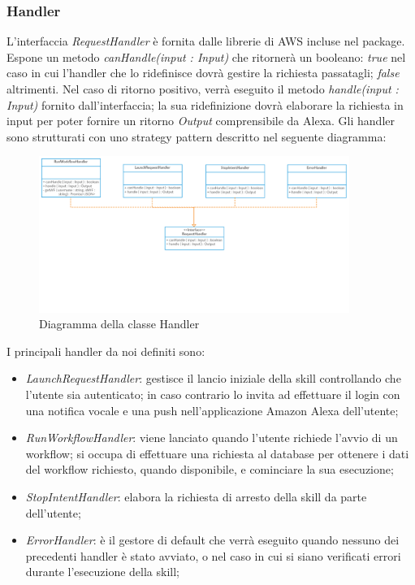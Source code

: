 \subsubsection{Handler}
L'interfaccia \emph{RequestHandler} è fornita dalle librerie di AWS incluse nel package.
Espone un metodo \textit{canHandle(input : Input)} che ritornerà un booleano: \textit{true} nel caso in cui l'handler che lo ridefinisce dovrà gestire la richiesta passatagli; \textit{false} altrimenti.
Nel caso di ritorno positivo, verrà eseguito il metodo \textit{handle(input : Input)} fornito dall'interfaccia; la sua ridefinizione dovrà elaborare la richiesta in input per poter fornire un ritorno \textit{Output} comprensibile da Alexa.
Gli handler sono strutturati con uno strategy pattern descritto nel seguente diagramma:

\begin{figure}[H]
	\begin{center}
		\includegraphics[width=0.9\textwidth, keepaspectratio]{../includes/pics/Strategy-Pattern.png}
		\caption{Diagramma della classe Handler}
	\end{center}
\end{figure}


I principali handler da noi definiti sono:
\begin{itemize}
	\item \textit{LaunchRequestHandler}: gestisce il lancio iniziale della skill controllando che l'utente sia autenticato; in caso contrario lo invita ad effettuare il login con una notifica vocale e una push nell'applicazione Amazon Alexa dell'utente;
	\item \textit{RunWorkflowHandler}: viene lanciato quando l'utente richiede l'avvio di un workflow; si occupa di effettuare una richiesta al database per ottenere i dati del workflow richiesto, quando disponibile, e cominciare la sua esecuzione;
	\item \textit{StopIntentHandler}: elabora la richiesta di arresto della skill da parte dell'utente;
	\item \textit{ErrorHandler}: è il gestore di default che verrà eseguito quando nessuno dei precedenti handler è stato avviato, o nel caso in cui si siano verificati errori durante l'esecuzione della skill;
\end{itemize}

